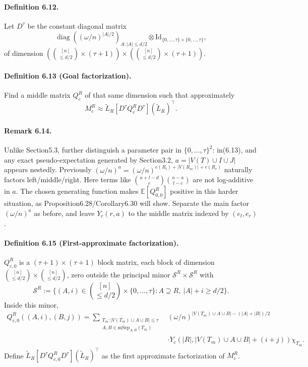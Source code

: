 \documentclass[10pt,a4paper]{article}
\begin{document}
\paragraph{Definition 6.12.} Let $D^\tau$ be the constant diagonal matrix
\[\operatorname{diag}((\omega/n)^{|A|/2})_{A:|A|\le d/2}\otimes\mathrm{Id}_{\{0,\ldots,\tau\}\times\{0,\ldots,\tau\}},\]
of dimension $(\binom{[n]}{\le d/2}\times(\tau+1))\times(\binom{[n]}{\le d/2}\times(\tau+1))$.
\paragraph{Definition 6.13 (Goal factorization).} Find a middle matrix $Q_c^R$ of that same dimension such that approximately
\[M_c^R\approx\widetilde L_R[D^\tau Q_c^R D^\tau](\widetilde L_R)^\top.\tag{6.21}\]
\paragraph{Remark 6.14.} Unlike Section5.3, further distinguish a parameter pair in $\{0,\ldots,\tau\}^2$: in(6.13), and any exact pseudo-expectation generated by Section3.2, $a=|V(T)\cup I\cup J|$ appears nestedly. Previously $(\omega/n)^a=(\omega/n)^{e(R_l)+|V(R_m)|+e(R_r)}$ naturally factors left/middle/right. Here terms like $\binom{a+l-d}c\binom{n-a}{l-c}$ are not log-additive in $a$. The chosen generating function makes $\mathbb E[Q_{0,0}^R]$ positive in this harder situation, as Proposition6.28/Corollary6.30 will show. Separate the main factor $(\omega/n)^a$ as before, and leave $Y_c(r,a)$ to the middle matrix indexed by $(e_l,e_r)$.
\paragraph{Definition 6.15 (First-approximate factorization).} $Q_{c,0}^R$ is a $(\tau+1)\times(\tau+1)$ block matrix, each block of dimension $\binom{[n]}{\le d/2}\times\binom{[n]}{\le d/2}$, zero outside the principal minor $\mathcal S^R\times\mathcal S^R$ with
\[\mathcal S^R:=\{(A,i)\in\binom{[n]}{\le d/2}\times\{0,\ldots,\tau\}:A\supseteq R,\ |A|+i\ge d/2\}.\tag{6.22}\]
Inside this minor,
\begin{align*}Q_{c,0}^R((A,i),(B,j))=\sum_{\substack{T_m:|V(T_m)\cup A\cup B|\le\tau\\A,B\in\mathrm{mSep}_{A,B}(T_m)}}&(\omega/n)^{|V(T_m)\cup A\cup B|-(|A|+|B|)/2}\\&\cdot Y_c(|R|,|V(T_m)\cup A\cup B|+(i+j))\chi_{T_m}.\tag{6.23}\end{align*}
Define $\widetilde L_R[D^\tau Q_{c,0}^R D^\tau](\widetilde L_R)^\top$ as the first approximate factorization of $M_c^R$.
\end{document}
